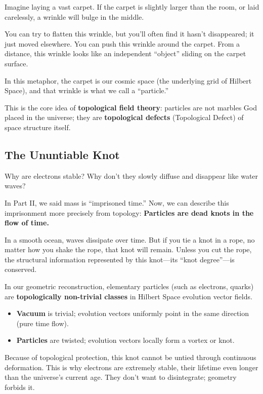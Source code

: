 \documentclass[11pt,a4paper,twoside]{book}
\begin{document}
Imagine laying a vast carpet. If the carpet is slightly larger than the room, or laid carelessly, a wrinkle will bulge in the middle.

You can try to flatten this wrinkle, but you'll often find it hasn't disappeared; it just moved elsewhere. You can push this wrinkle around the carpet. From a distance, this wrinkle looks like an independent ``object'' sliding on the carpet surface.

In this metaphor, the carpet is our cosmic space (the underlying grid of Hilbert Space), and that wrinkle is what we call a ``particle.''

This is the core idea of \textbf{topological field theory}: particles are not marbles God placed in the universe; they are \textbf{topological defects} (Topological Defect) of space structure itself.

\subsection{The Ununtiable Knot}

Why are electrons stable? Why don't they slowly diffuse and disappear like water waves?

In Part II, we said mass is ``imprisoned time.'' Now, we can describe this imprisonment more precisely from topology: \textbf{Particles are dead knots in the flow of time.}

In a smooth ocean, waves dissipate over time. But if you tie a knot in a rope, no matter how you shake the rope, that knot will remain. Unless you cut the rope, the structural information represented by this knot---its ``knot degree''---is conserved.

In our geometric reconstruction, elementary particles (such as electrons, quarks) are \textbf{topologically non-trivial classes} in Hilbert Space evolution vector fields.

\begin{itemize}
\item \textbf{Vacuum} is trivial; evolution vectors uniformly point in the same direction (pure time flow).

\item \textbf{Particles} are twisted; evolution vectors locally form a vortex or knot.
\end{itemize}

Because of topological protection, this knot cannot be untied through continuous deformation. This is why electrons are extremely stable, their lifetime even longer than the universe's current age. They don't want to disintegrate; geometry forbids it.
\end{document}
